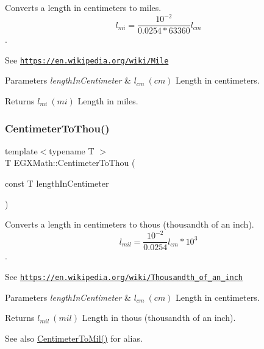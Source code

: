 Converts a length in centimeters to miles. \[ l_{mi}=\frac{10^{-2}}{0.0254 * 63360} l_{cm} \]. 

See \href{https://en.wikipedia.org/wiki/Mile}{\tt https\+://en.\+wikipedia.\+org/wiki/\+Mile} 
\begin{DoxyParams}{Parameters}
{\em length\+In\+Centimeter} & $ l_{cm}\ (cm)$ Length in centimeters. \\
\hline
\end{DoxyParams}
\begin{DoxyReturn}{Returns}
$ l_{mi}\ (mi)$ Length in miles. 
\end{DoxyReturn}
\mbox{\label{group___e_g_x_math-_conversions-_length_conversions-_s_i-_centimeter-_imperial_ga06aee91cfbc90db20c6a085129dbf4fa}} 
\subsubsection{\texorpdfstring{Centimeter\+To\+Thou()}{CentimeterToThou()}}
{\footnotesize\ttfamily template$<$typename T $>$ \\
T E\+G\+X\+Math\+::\+Centimeter\+To\+Thou (\begin{DoxyParamCaption}\item[{const T}]{length\+In\+Centimeter }\end{DoxyParamCaption})}



Converts a length in centimeters to thous (thousandth of an inch). \[ l_{mil}= \frac{10^{-2}}{0.0254} l_{cm} * 10^{3} \]. 

See \href{https://en.wikipedia.org/wiki/Thousandth_of_an_inch}{\tt https\+://en.\+wikipedia.\+org/wiki/\+Thousandth\+\_\+of\+\_\+an\+\_\+inch} 
\begin{DoxyParams}{Parameters}
{\em length\+In\+Centimeter} & $ l_{cm}\ (cm)$ Length in centimeters. \\
\hline
\end{DoxyParams}
\begin{DoxyReturn}{Returns}
$ l_{mil}\ (mil)$ Length in thous (thousandth of an inch). 
\end{DoxyReturn}
\begin{DoxySeeAlso}{See also}
\mbox{\hyperlink{group___e_g_x_math-_conversions-_length_conversions-_s_i-_centimeter-_imperial_ga4d32adb63d2c5ac44ce1f7a0ba746452}{Centimeter\+To\+Mil()}} for alias. 
\end{DoxySeeAlso}
\mbox{\label{group___e_g_x_math-_conversions-_length_conversions-_s_i-_centimeter-_imperial_ga9b25beac97b6dfc0700508ca60760dfe}} 
